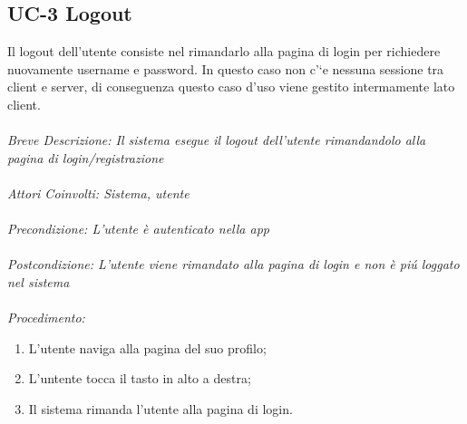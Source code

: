 \subsection{UC-3 Logout}
Il logout dell’utente consiste nel rimandarlo alla pagina di login per richiedere nuovamente username e password. In questo caso non c’`e nessuna sessione tra client e server, di conseguenza questo caso d’uso viene gestito intermamente lato client.\\
\\
\textit{Breve Descrizione: Il sistema esegue il logout dell'utente rimandandolo alla pagina di login/registrazione} 
\\
\\
\textit{Attori Coinvolti: Sistema, utente}
\\
\\
\textit{Precondizione: L'utente è autenticato nella app}
\\
\\
\textit{Postcondizione: L'utente viene rimandato alla pagina di login e non è piú loggato nel sistema}
\\
\\
\textit{Procedimento:}
\begin{enumerate}
	\item L'utente naviga alla pagina del suo profilo;
	\item L'untente tocca il tasto in alto a destra;
	\item Il sistema rimanda l'utente alla pagina di login.
\end{enumerate}